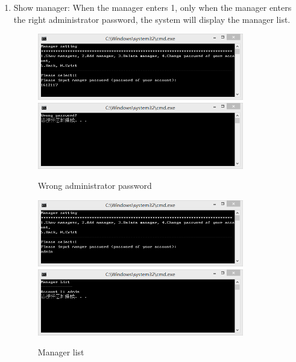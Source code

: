 \documentclass{article}
\begin{document}
\begin{enumerate}
    \item Show manager:\newline 
    When the manager enters 1, only when the manager enters the right administrator password, the system will display the manager list.
        \begin{figure}[H]
        \centering
        \includegraphics[width=0.85\textwidth]{C/222222a.png}
        \includegraphics[width=0.85\textwidth]{C/222222b.png}
        \caption{Wrong administrator password}
        \end{figure}
        \begin{figure}[H]
        \centering
        \includegraphics[width=0.85\textwidth]{C/222222c.png}
        \includegraphics[width=0.85\textwidth]{C/222222d.png}
        \caption{Manager list}
        \end{figure}
    

\end{enumerate}
\end{document}
